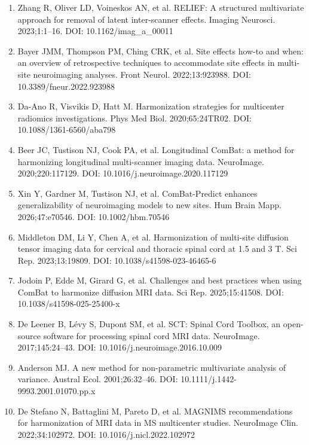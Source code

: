 \documentclass[12pt,a4paper]{article}
\begin{document}
\begin{enumerate}[nosep,leftmargin=*]
\item Zhang R, Oliver LD, Voineskos AN, et al. RELIEF: A structured multivariate approach for removal of latent inter-scanner effects. Imaging Neurosci. 2023;1:1--16. DOI: 10.1162/imag\_a\_00011
\item Bayer JMM, Thompson PM, Ching CRK, et al. Site effects how-to and when: an overview of retrospective techniques to accommodate site effects in multi-site neuroimaging analyses. Front Neurol. 2022;13:923988. DOI: 10.3389/fneur.2022.923988
\item Da-Ano R, Visvikis D, Hatt M. Harmonization strategies for multicenter radiomics investigations. Phys Med Biol. 2020;65:24TR02. DOI: 10.1088/1361-6560/aba798
\item Beer JC, Tustison NJ, Cook PA, et al. Longitudinal ComBat: a method for harmonizing longitudinal multi-scanner imaging data. NeuroImage. 2020;220:117129. DOI: 10.1016/j.neuroimage.2020.117129
\item Xin Y, Gardner M, Tustison NJ, et al. ComBat-Predict enhances generalizability of neuroimaging models to new sites. Hum Brain Mapp. 2026;47:e70546. DOI: 10.1002/hbm.70546
\item Middleton DM, Li Y, Chen A, et al. Harmonization of multi-site diffusion tensor imaging data for cervical and thoracic spinal cord at 1.5 and 3 T. Sci Rep. 2023;13:19809. DOI: 10.1038/s41598-023-46465-6
\item Jodoin P, Edde M, Girard G, et al. Challenges and best practices when using ComBat to harmonize diffusion MRI data. Sci Rep. 2025;15:41508. DOI: 10.1038/s41598-025-25400-x
\item De Leener B, Lévy S, Dupont SM, et al. SCT: Spinal Cord Toolbox, an open-source software for processing spinal cord MRI data. NeuroImage. 2017;145:24--43. DOI: 10.1016/j.neuroimage.2016.10.009
\item Anderson MJ. A new method for non-parametric multivariate analysis of variance. Austral Ecol. 2001;26:32--46. DOI: 10.1111/j.1442-9993.2001.01070.pp.x
\item De Stefano N, Battaglini M, Pareto D, et al. MAGNIMS recommendations for harmonization of MRI data in MS multicenter studies. NeuroImage Clin. 2022;34:102972. DOI: 10.1016/j.nicl.2022.102972
\end{enumerate}
\end{document}
